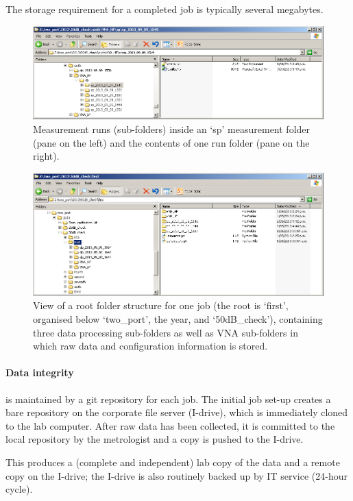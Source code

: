 The storage requirement for a completed job is typically several megabytes.

\begin{figure}[ht]
 \centering
  \includegraphics[width=0.8\linewidth]{pictures/filesystem_vna_runs.png}
  \caption{Measurement runs (sub-folders) inside an `sp' measurement folder (pane on the left) and the contents of one run folder (pane on the right).}
  \label{fig:runs}
\end{figure}

\begin{figure}[ht]
 \centering
  \includegraphics[width=0.8\linewidth]{pictures/filesystem_runs.png}
  \caption{View of a root folder structure for one job (the root is `first', organised below `two\_port', the year, and `50dB\_check'), containing three data processing sub-folders as well as VNA sub-folders in which raw data and configuration information is stored.}
  \label{fig:folders}
\end{figure}

\paragraph{Data integrity} is maintained by a git repository for each job. The initial job set-up creates a bare repository on the corporate file server (I-drive), which is immediately cloned to the lab computer. After raw data has been collected, it is committed to the local repository by the metrologist and a copy is pushed to the I-drive. 

This produces a (complete and independent) lab copy of the data and a remote copy on the I-drive; the I-drive is also routinely backed up by IT service (24-hour cycle). 

